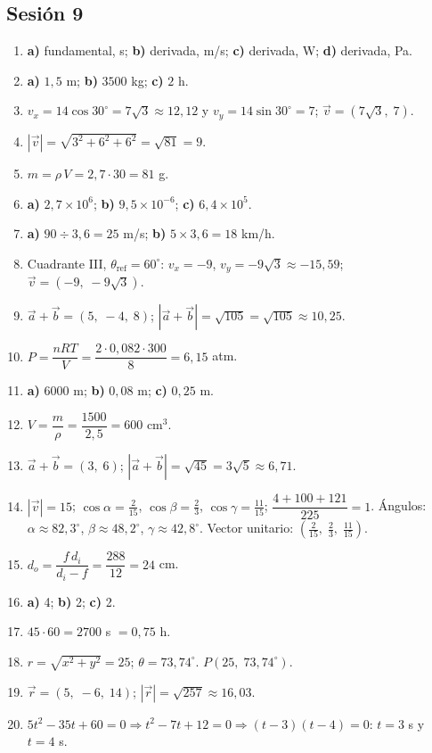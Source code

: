 \documentclass[12pt, letterpaper]{article}
\providecommand{\sen}{\sin}
\begin{document}
\subsection*{Sesión 9}
\begin{enumerate}[leftmargin=*, label=\textbf{\arabic*.}]
  \item \textbf{a)} fundamental, s; \textbf{b)} derivada, m/s; \textbf{c)} derivada, W; \textbf{d)} derivada, Pa.
  \item \textbf{a)} $1{,}5$ m; \textbf{b)} $3500$ kg; \textbf{c)} $2$ h.
  \item $v_x=14\cos 30^{\circ}=7\sqrt{3}\approx 12{,}12$ y $v_y=14\sen 30^{\circ}=7$; $\vec v=(7\sqrt{3},\; 7)$.
  \item $|\vec v|=\sqrt{3^2+6^2+6^2}=\sqrt{81}=9$.
  \item $m=\rho\,V=2{,}7\cdot 30=81$ g.
  \item \textbf{a)} $2{,}7 \times 10^{6}$; \textbf{b)} $9{,}5 \times 10^{-6}$; \textbf{c)} $6{,}4 \times 10^{5}$.
  \item \textbf{a)} $90 \div 3{,}6 = 25$ m/s; \quad \textbf{b)} $5 \times 3{,}6 = 18$ km/h.
  \item Cuadrante III, $\theta_{\text{ref}}=60^{\circ}$: $v_x=-9$, $v_y=-9\sqrt{3}\approx -15{,}59$; $\vec v=(-9,\; -9\sqrt{3})$.
  \item $\vec a+\vec b=(5,\; -4,\; 8)$; $|\vec a+\vec b|=\sqrt{105}=\sqrt{105}\approx 10{,}25$.
  \item $P=\dfrac{nRT}{V}=\dfrac{2\cdot 0{,}082\cdot 300}{8}=6{,}15$ atm.
  \item \textbf{a)} $6000$ m; \textbf{b)} $0{,}08$ m; \textbf{c)} $0{,}25$ m.
  \item $V=\dfrac{m}{\rho}=\dfrac{1500}{2{,}5}=600$ cm$^3$.
  \item $\vec a+\vec b=(3,\; 6)$; $|\vec a+\vec b|=\sqrt{45}=3\sqrt{5}\approx 6{,}71$.
  \item $|\vec v|=15$; $\cos\alpha=\frac{2}{15}$, $\cos\beta=\frac{2}{3}$, $\cos\gamma=\frac{11}{15}$; $\dfrac{4+100+121}{225}=1$. \checkmark\quad Ángulos: $\alpha\approx 82{,}3^{\circ}$, $\beta\approx 48{,}2^{\circ}$, $\gamma\approx 42{,}8^{\circ}$. Vector unitario: $(\frac{2}{15},\; \frac{2}{3},\; \frac{11}{15})$.
  \item $d_o=\dfrac{f\,d_i}{d_i-f}=\dfrac{288}{12}=24$ cm.
  \item \textbf{a)} 4; \quad \textbf{b)} 2; \quad \textbf{c)} 2.
  \item $45\cdot 60=2700$ s $=0{,}75$ h.
  \item $r=\sqrt{x^2+y^2}=25$; $\theta=73{,}74^{\circ}$. $P(25,\; 73{,}74^{\circ})$.
  \item $\vec r=(5,\; -6,\; 14)$; $|\vec r|=\sqrt{257}\approx 16{,}03$.
  \item $5t^2-35t+60=0\Rightarrow t^2-7t+12=0\Rightarrow(t-3)(t-4)=0$: $t=3$ s y $t=4$ s.
\end{enumerate}
\end{document}
